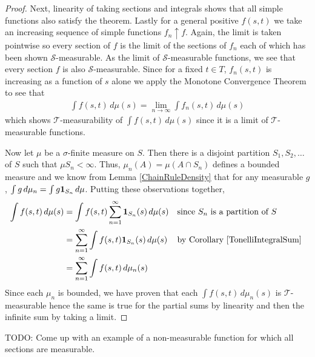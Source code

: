 \documentclass{amsart}
\theoremstyle{remark}
\theoremstyle{definition}
\begin{document}
\begin{proof}
Next, linearity of taking sections and integrals shows that all simple functions
also satisfy the theorem.  Lastly for a general positive $f(s,t)$ we
take an increasing sequence of simple functions $f_n \uparrow f$.
Again, the limit is taken pointwise so every section of $f$ is the
limit of the sections of $f_n$ each of which has been shown
$\mathcal{S}$-measurable.  As the limit of $\mathcal{S}$-measurable
functions, we see that every section $f$ is also
$\mathcal{S}$-measurable.  Since for a fixed $t \in T$, $f_n(s,t)$ is
increasing as a function of $s$ alone we apply the Monotone
Convergence Theorem to see that
\begin{align*}
\int f(s,t) \, d\mu(s) = \lim_{n \to \infty} \int f_n(s,t) \, d\mu(s)
\end{align*}
which shows $\mathcal{T}$-measurability of $\int f(s,t) \, d\mu(s)$
since it is a limit of $\mathcal{T}$-measurable functions.

Now let $\mu$ be a $\sigma$-finite measure on $S$.  Then there is a
disjoint partition $S_1, S_2, \dots$ of $S$ such that $\mu S_n <
\infty$.  Thus, $\mu_n (A) = \mu(A \cap S_n)$ defines a bounded
measure and we know from Lemma \ref{ChainRuleDensity} that for any
measurable $g$, $\int g \, d\mu_n = \int g
\textbf{1}_{S_n} \, d\mu$.
Putting these observations together,
\begin{align*}
\int f(s,t) \,  d \mu(s) &= \int f(s,t) \sum_{n=1}^\infty
\textbf{1}_{S_n}(s) \,  d \mu(s) & & \text{since $S_n$ is a partition
  of $S$} \\
&= \sum_{n=1}^\infty \int f(s,t) 
\textbf{1}_{S_n}(s) \,  d \mu(s) & & \text{by Corollary 
  \ref{TonelliIntegralSum} } \\
&= \sum_{n=1}^\infty \int f(s,t) \,  d \mu_n(s) 
\end{align*}
Since each $\mu_n$ is bounded, we have proven that each $\int f(s,t) \,  d \mu_n(s) $ is
$\mathcal{T}$-measurable hence the same is true for the partial sums
by linearity and then the infinite sum by taking a limit.
\end{proof}

TODO: Come up with an example of a non-measurable function for which all sections are measurable.
\end{document}
